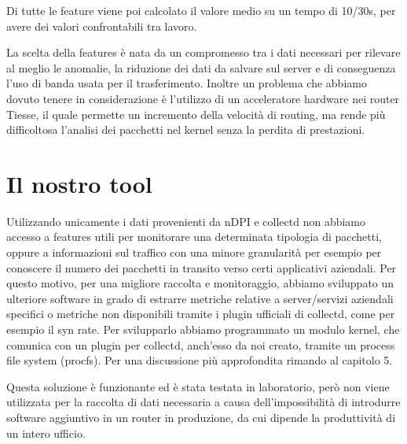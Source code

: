 Di tutte le feature viene poi calcolato il valore medio su un tempo di 10/30s, per avere dei valori confrontabili tra lavoro.

La scelta della features è nata da un compromesso tra i dati necessari per rilevare al meglio le anomalie, la riduzione dei dati da salvare sul server e di conseguenza l'uso di banda usata per il trasferimento. Inoltre un problema che abbiamo dovuto tenere in considerazione è l'utilizzo di un acceleratore hardware nei router Tiesse, il quale permette un incremento della velocità di routing, ma rende più difficoltosa l'analisi dei pacchetti nel kernel senza la perdita di prestazioni.
 
\section{Il nostro tool}
\label{section:our_tool}

Utilizzando unicamente i dati provenienti da nDPI e collectd non abbiamo accesso a features utili per monitorare una determinata tipologia di pacchetti, oppure a informazioni sul traffico con una minore granularità per esempio per conoscere il numero dei pacchetti in transito verso certi applicativi aziendali. Per questo motivo, per una migliore raccolta e monitoraggio, abbiamo sviluppato un ulteriore software in grado di estrarre metriche relative a server/servizi aziendali specifici o metriche non disponibili tramite i plugin ufficiali di collectd, come per esempio il syn rate. Per svilupparlo abbiamo programmato un modulo kernel, che comunica con un plugin per collectd, anch'esso da noi creato, tramite un process file system (procfs). Per una discussione più approfondita rimando al capitolo 5.

Questa soluzione è funzionante ed è stata testata in laboratorio, però non viene utilizzata per la raccolta di dati necessaria a causa dell'impossibilità di introdurre software aggiuntivo in un router in produzione, da cui dipende la produttività di un intero ufficio. 
 
 
